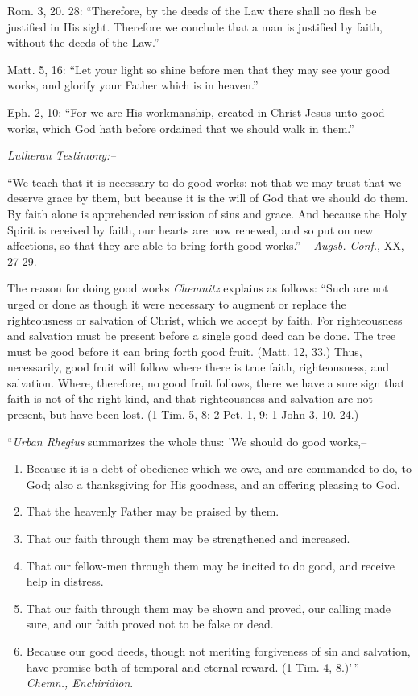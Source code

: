 \documentclass[
]{book}
\begin{document}
Rom. 3, 20. 28: ``Therefore, by the deeds of the Law there shall no flesh be justified in His sight. Therefore we conclude that a man is justified by faith, without the deeds of the Law.''

Matt. 5, 16: ``Let your light so shine before men that they may see your good works, and glorify your Father which is in heaven.''

Eph. 2, 10: ``For we are His workmanship, created in Christ Jesus unto good works, which God hath before ordained that we should walk in them.''

\begin{center}
\textsl{Lutheran Testimony:--}
\end{center}

``We teach that it is necessary to do good works; not that we may trust that we deserve grace by them, but because it is the will of God that we should do them. By faith alone is apprehended remission of sins and grace. And because the Holy Spirit is received by faith, our hearts are now renewed, and so put on new affections, so that they are able to bring forth good works.'' -- \emph{Augsb. Conf.}, XX, 27-29.

The reason for doing good works \emph{Chemnitz} explains as follows: ``Such are not urged or done as though it were necessary to augment or replace the righteousness or salvation of Christ, which we accept by faith. For righteousness and salvation must be present before a single good deed can be done. The tree must be good before it can bring forth good fruit. (Matt. 12, 33.) Thus, necessarily, good fruit will follow where there is true faith, righteousness, and salvation. Where, therefore, no good fruit follows, there we have a sure sign that faith is not of the right kind, and that righteousness and salvation are not present, but have been lost. (1 Tim. 5, 8; 2 Pet. 1, 9; 1 John 3, 10. 24.)

``\emph{Urban Rhegius} summarizes the whole thus: 'We should do good works,--

\begin{enumerate}
\def\labelenumi{\arabic{enumi}.}
\item
  Because it is a debt of obedience which we owe, and are commanded to do, to God; also a thanksgiving for His goodness, and an offering pleasing to God.
\item
  That the heavenly Father may be praised by them.
\item
  That our faith through them may be strengthened and increased.
\item
  That our fellow-men through them may be incited to do good, and receive help in distress.
\item
  That our faith through them may be shown and proved, our calling made sure, and our faith proved not to be false or dead.
\item
  Because our good deeds, though not meriting forgiveness of sin and salvation, have promise both of temporal and eternal reward. (1 Tim. 4, 8.)'\,'' -- \emph{Chemn., Enchiridion}.
\end{enumerate}
\end{document}
